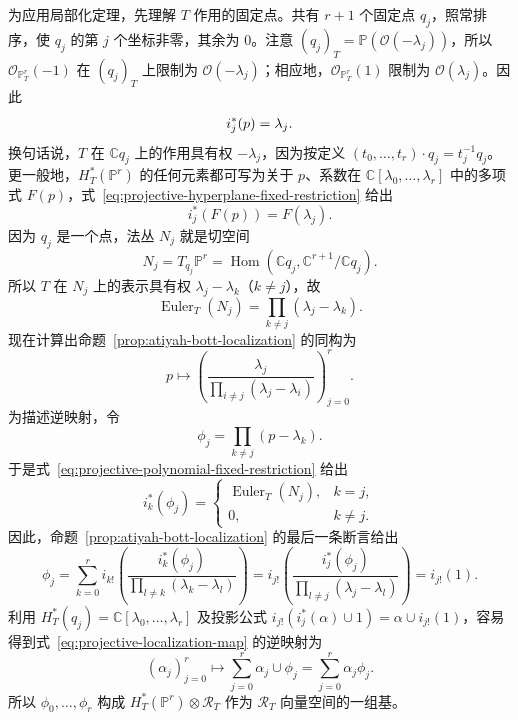 \begin{example}
为应用局部化定理，先理解 $T$ 作用的固定点。共有 $r+1$ 个固定点 $q_j$，照常排序，使 $q_j$ 的第 $j$ 个坐标非零，其余为 $0$。注意 $(q_j)_T=\mathbb P(\mathcal O(-\lambda_j))$，所以 $\mathcal O_{\mathbb P_T^r}(-1)$ 在 $(q_j)_T$ 上限制为 $\mathcal O(-\lambda_j)$；相应地，$\mathcal O_{\mathbb P_T^r}(1)$ 限制为 $\mathcal O(\lambda_j)$。因此
\begin{equation}\label{eq:projective-hyperplane-fixed-restriction}\index{等变超平面类|hyperpage}
i_j^*(p)=\lambda_j.
\end{equation}
换句话说，$T$ 在 $\mathbb Cq_j$ 上的作用具有权 $-\lambda_j$，因为按定义 $(t_0,\ldots,t_r)\cdot q_j=t_j^{-1}q_j$。更一般地，$H_T^*(\mathbb P^r)$ 的任何元素都可写为关于 $p$、系数在 $\mathbb C[\lambda_0,\ldots,\lambda_r]$ 中的多项式 $F(p)$，式~\eqref{eq:projective-hyperplane-fixed-restriction} 给出
\begin{equation}\label{eq:projective-polynomial-fixed-restriction}
i_j^*(F(p))=F(\lambda_j).
\end{equation}
因为 $q_j$ 是一个点，法丛 $N_j$ 就是切空间
\[
N_j=T_{q_j}\mathbb P^r=\operatorname{Hom}(\mathbb Cq_j,\mathbb C^{r+1}/\mathbb Cq_j).
\]
所以 $T$ 在 $N_j$ 上的表示具有权 $\lambda_j-\lambda_k$（$k\ne j$），故
\begin{equation}\label{eq:projective-fixed-euler}
\operatorname{Euler}_T(N_j)=\prod_{k\ne j}(\lambda_j-\lambda_k).
\end{equation}
现在计算出命题~\ref{prop:atiyah-bott-localization} 的同构为
\begin{equation}\label{eq:projective-localization-map}
p\longmapsto\left(\frac{\lambda_j}{\prod_{i\ne j}(\lambda_j-\lambda_i)}\right)_{j=0}^r.
\end{equation}
为描述逆映射，令
\begin{equation}\label{eq:projective-fixed-dual-class}
\phi_j=\prod_{k\ne j}(p-\lambda_k).
\end{equation}
于是式~\eqref{eq:projective-polynomial-fixed-restriction} 给出
\begin{equation}\label{eq:projective-dual-class-restriction}
i_k^*(\phi_j)=\begin{cases}\operatorname{Euler}_T(N_j),&k=j,\\0,&k\ne j.\end{cases}
\end{equation}
因此，命题~\ref{prop:atiyah-bott-localization} 的最后一条断言给出
\[
\phi_j=\sum_{k=0}^ri_{k!}\left(\frac{i_k^*(\phi_j)}{\prod_{l\ne k}(\lambda_k-\lambda_l)}\right)
=i_{j!}\left(\frac{i_j^*(\phi_j)}{\prod_{l\ne j}(\lambda_j-\lambda_l)}\right)=i_{j!}(1).
\]
利用 $H_T^*(q_j)=\mathbb C[\lambda_0,\ldots,\lambda_r]$ 及投影公式 $i_{j!}(i_j^*(\alpha)\cup1)=\alpha\cup i_{j!}(1)$，容易得到式~\eqref{eq:projective-localization-map} 的逆映射为
\[
(\alpha_j)_{j=0}^r\longmapsto\sum_{j=0}^r\alpha_j\cup\phi_j=\sum_{j=0}^r\alpha_j\phi_j.
\]
所以 $\phi_0,\ldots,\phi_r$ 构成 $H_T^*(\mathbb P^r)\otimes\mathcal R_T$ 作为 $\mathcal R_T$ 向量空间的一组基。


\end{example}
